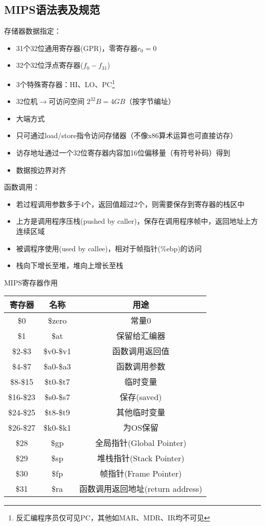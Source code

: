 \subsection{MIPS语法表及规范}
存储器数据指定：
\begin{itemize}
	\item 31个32位通用寄存器(GPR)，零寄存器$r_0=0$
	\item 32个32位浮点寄存器($f_0-f_{31}$)
	\item 3个特殊寄存器：HI、LO、PC\footnote{反汇编程序员仅可见PC，其他如MAR、MDR、IR均不可见}
	\item 32位机$\to$可访问空间 $2^{32}B=4GB$（按字节编址）
	\item 大端方式
	\item 只可通过load/store指令访问存储器（不像x86算术运算也可直接访存）
	\item 访存地址通过一个32位寄存器内容加16位偏移量（有符号补码）得到
	\item 数据按边界对齐
\end{itemize}
\par 函数调用：
\begin{itemize}
	\item 若过程调用参数多于4个，返回值超过2个，则需要保存到寄存器的栈区中
	\item 上方是调用程序压栈(pushed by caller)，保存在调用程序帧中，返回地址上方连续区域
	\item 被调程序使用(used by callee)，相对于帧指针(\%ebp)的访问
	\item 栈向下增长至堆，堆向上增长至栈
\end{itemize}

\begin{center}
MIPS寄存器作用\\
\begin{tabular}{|c|c|c|}
\hline
寄存器 & 名称 & 用途\\\hline
\$0 & \$zero & 常量0\\\hline
\$1 & \$at & 保留给汇编器\\\hline
\$2-\$3 & \$v0-\$v1 & 函数调用返回值\\\hline
\$4-\$7 & \$a0-\$a3 & 函数调用参数\\\hline
\$8-\$15 & \$t0-\$t7 & 临时变量\\\hline
\$16-\$23 & \$s0-\$s7 & 保存(saved)\\\hline
\$24-\$25 & \$t8-\$t9 & 其他临时变量\\\hline
\$26-\$27 & \$k0-\$k1 & 为OS保留\\\hline
\$28 & \$gp & 全局指针(Global Pointer)\\\hline
\$29 & \$sp & 堆栈指针(Stack Pointer)\\\hline
\$30 & \$fp & 帧指针(Frame Pointer)\\\hline
\$31 & \$ra & 函数调用返回地址(return address)\\\hline
\end{tabular}
\end{center}

